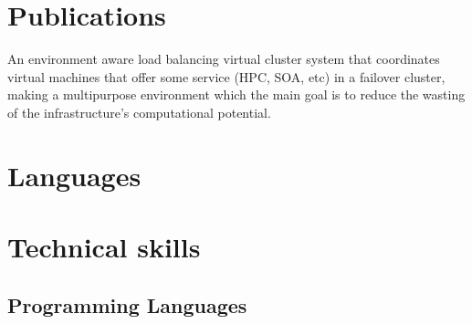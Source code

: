 \documentclass[11pt, a4paper, sans]{moderncv} %
\begin{document}
\section{Publications}
{
An environment aware load balancing virtual cluster system that coordinates virtual machines that offer some service (HPC, SOA, etc) in a failover cluster, making a multipurpose environment which the main goal is to reduce the wasting of the infrastructure's computational potential. 
}












\section{Languages}











\section{Technical skills}

\subsection{Programming Languages}
\end{document}
